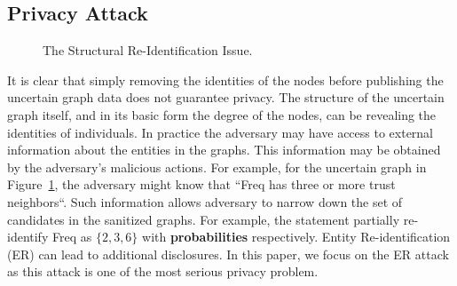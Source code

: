 \subsection{Privacy Attack}
\label{sec:AMPC}
\vspace{-5pt}
\begin{figure}[!htb]
  \vspace{-10pt}
    \vspace{-7pt}
    \caption{The Structural Re-Identification Issue.}
    \label{fig:privacyAttack}
    \vspace{-7pt}
\end{figure} 
It is clear that simply removing the identities of the nodes before publishing the uncertain graph data does not guarantee privacy.  The structure of the uncertain graph itself, and in its basic form the degree of the nodes, can be revealing the identities of individuals. In practice the adversary may have access to external information about the entities in the graphs. This information may be obtained by the adversary's malicious actions. For example, for the uncertain graph in Figure~\ref{fig:privacyAttack}, the adversary might know that ``Freq has three or more trust neighbors“. Such information allows adversary to narrow down the set of candidates in the sanitized graphs. For example, the statement partially re-identify Freq as $\lbrace 2,3,6 \rbrace$ with \textbf{probabilities} respectively. Entity Re-identification (ER) can lead to additional disclosures. In this paper, we focus on the ER attack as this attack is one of the most serious privacy problem. 



